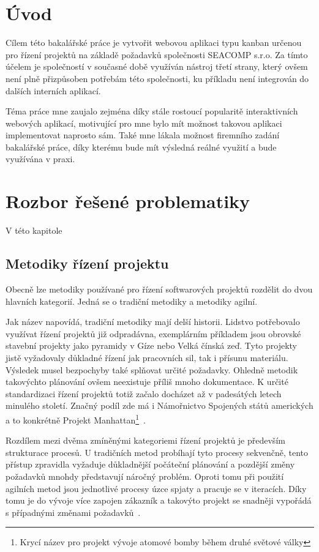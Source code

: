 \chapter{Úvod}
\blindtext

Cílem této bakalářské práce je vytvořit webovou aplikaci typu kanban určenou pro řízení projektů na základě požadavků společnosti SEACOMP s.r.o. Za tímto účelem je společností v současné době využíván nástroj třetí strany, který ovšem není plně přizpůsoben potřebám této společnosti, ku příkladu není integrován do dalších interních aplikací.

Téma práce mne zaujalo zejména díky stále rostoucí popularitě interaktivních webových aplikací, motivující pro mne bylo mít možnost takovou aplikaci implementovat naprosto sám. Také mne lákala možnost firemního zadání bakalářské práce, díky kterému bude mít výsledná reálné využití a bude využívána v praxi. 

\blindtext

\chapter{Rozbor řešené problematiky}
V této kapitole\blindtext

\section{Metodiky řízení projektu}
Obecně lze metodiky používané pro řízení softwarových projektů rozdělit do dvou hlavních kategorií. Jedná se o tradiční metodiky a metodiky agilní.

Jak název napovídá, tradiční metodiky mají delší historii. Lidstvo potřebovalo využívat řízení projektů již odpradávna, exemplárním příkladem jsou obrovské stavební projekty jako pyramidy v Gíze nebo Velká čínská zeď. Tyto projekty jistě vyžadovaly důkladné řízení jak pracovních sil, tak i přísunu materiálu. Výsledek musel bezpochyby také splňovat určité požadavky. Ohledně metodik takovýchto plánování ovšem neexistuje příliš mnoho dokumentace. K určité standardizaci řízení projektů totiž začalo docházet až v padesátých letech minulého století. Značný podíl zde má i Námořnictvo Spojených států amerických a to konkrétně Projekt Manhattan\footnote{Krycí název pro projekt vývoje atomové bomby během druhé světové války}~\cite{bib:project-managment-history}.

Rozdílem mezi dvěma zmíněnými kategoriemi řízení projektů je především strukturace procesů. U tradičních metod probíhají tyto procesy sekvenčně, tento přístup zpravidla vyžaduje důkladnější počáteční plánování a pozdější změny požadavků mnohdy představují náročný problém. Oproti tomu při použití agilních metod jsou jednotlivé procesy úzce spjaty a pracuje se v iteracích. Díky tomu je do vývoje více zapojen zákazník a takovýto projekt se snadněji vypořádá s případnými změnami požadavků~\cite{bib:agile-vs-traditional}. 

